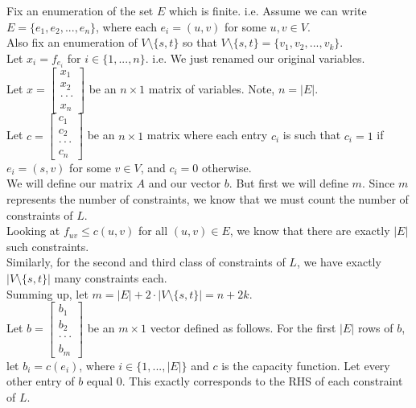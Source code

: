 \documentclass[12pt]{article}
\begin{document}
Fix an enumeration of the set $E$ which is finite. i.e. Assume we can write $E = \{e_1,e_2,...,e_n\}$, where each $e_i = (u,v)$ for some $u,v \in V$. \\

Also fix an enumeration of $V \setminus \{s,t\}$ so that $V \setminus \{s,t\} = \{v_1,v_2,...,v_k\}$. \\

Let $x_i = f_{e_i}$ for $i \in \{1,...,n\}$. i.e. We just renamed our original variables. \\

Let $x = \begin{bmatrix} x_1 \\ x_2 \\ \cdot \cdot \cdot \\ x_n \end{bmatrix}$ be an $n \times 1$ matrix of variables. Note, $n = |E|$. \\

Let $c = \begin{bmatrix} c_1 \\ c_2 \\ \cdot \cdot \cdot \\ c_n \end{bmatrix}$ be an $n \times 1$ matrix where each entry $c_i$ is such that $c_i = 1$ if $e_i = (s,v)$ for some $v \in V$, and $c_i = 0$ otherwise. \\

We will define our matrix $A$ and our vector $b$. But first we will define $m$. Since $m$ represents the number of constraints, we know that we must count the number of constraints of $L$. \\

Looking at $f_{uv} \leq c(u,v)$ for all $(u,v) \in E$, we know that there are exactly $|E|$ such constraints. \\

Similarly, for the second and third class of constraints of $L$, we have exactly $|V \setminus \{s,t\}|$ many constraints each. \\

Summing up, let $m = |E| + 2 \cdot |V \setminus \{s,t\}| = n + 2k$. \\

Let $b = \begin{bmatrix} b_1 \\ b_2 \\ \cdot \cdot \cdot \\ b_m \end{bmatrix}$ be an $m \times 1$ vector defined as follows. For the first $|E|$ rows of $b$, let $b_i = c(e_i)$, where $i \in \{1,...,|E|\}$ and $c$ is the capacity function. Let every other entry of $b$ equal 0. This exactly corresponds to the RHS of each constraint of $L$. \\
\end{document}
